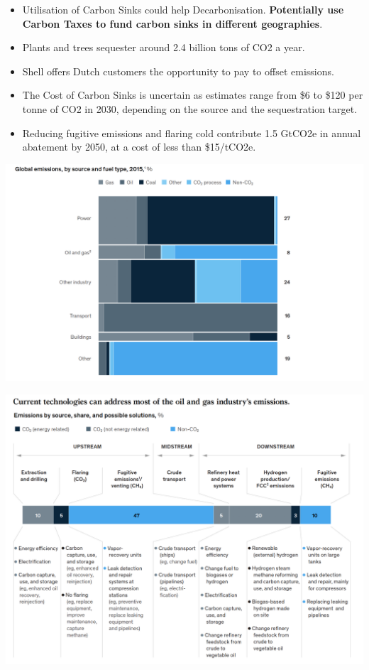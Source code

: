 \documentclass[12pt]{article}
\begin{document}
\begin{itemize}
        \item Utilisation of Carbon Sinks could help Decarbonisation. \textbf{Potentially use Carbon Taxes to fund carbon sinks in different geographies}.
        \item Plants and trees sequester around 2.4 billion tons of CO2 a year.
        \item Shell offers Dutch customers the opportunity to pay to offset emissions.
        \item The Cost of Carbon Sinks is uncertain as estimates range from \$6 to \$120 per tonne of CO2 in 2030, depending on the source and the sequestration target.
        \item Reducing fugitive emissions and flaring cold contribute 1.5 GtCO2e in annual abatement by 2050, at a cost of less than \$15/tCO2e.
    \end{itemize}
    \begin{center}
        \includegraphics[width=\textwidth]{GE}
        \vspace{-1cm}
    \end{center}
    \begin{center}
        \includegraphics[width=\textwidth]{CT}
        \vspace{-1cm}
    \end{center}
\end{document}
